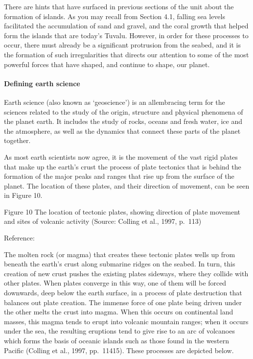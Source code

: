 \documentclass[letterpaper,10pt,english]{sphinxmanual}
\let\sphinxpxdimen\pdfpxdimen\else\newdimen\sphinxpxdimen
\begin{document}
There are hints that have surfaced in previous sections of the unit about the formation of islands. As you may recall from Section 4.1, falling sea levels facilitated the accumulation of sand and gravel, and the coral growth that helped form the islands that are today’s Tuvalu. However, in order for these processes to occur, there must already be a significant protrusion from the seabed, and it is the formation of such irregularities that directs our attention to some of the most powerful forces
that have shaped, and continue to shape, our planet.


\paragraph{Defining earth science}
\label{\detokenize{content/session_00/Part_00_04:Defining-earth-science}}
Earth science (also known as ‘geoscience’) is an all\sphinxhyphen{}embracing term for the sciences related to the study of the origin, structure and physical phenomena of the planet earth. It includes the study of rocks, oceans and fresh water, ice and the atmosphere, as well as the dynamics that connect these parts of the planet together.

As most earth scientists now agree, it is the movement of the vast rigid plates that make up the earth’s crust \textendash{} the process of plate tectonics \textendash{} that is behind the formation of the major peaks and ranges that rise up from the surface of the planet. The location of these plates, and their direction of movement, can be seen in Figure 10.

\sphinxincludegraphics[width=443\sphinxpxdimen,height=316\sphinxpxdimen]{{dd205_3_010i}.jpg}

Figure 10 The location of tectonic plates, showing direction of plate movement and sites of volcanic activity (Source: Colling et al., 1997, p. 113)

Reference:

The molten rock (or magma) that creates these tectonic plates wells up from beneath the earth’s crust along submarine ridges on the seabed. In turn, this creation of new crust pushes the existing plates sideways, where they collide with other plates. When plates converge in this way, one of them will be forced downwards, deep below the earth surface, in a process of plate destruction that balances out plate creation. The immense force of one plate being driven under the other melts the crust
into magma. When this occurs on continental land masses, this magma tends to erupt into volcanic mountain ranges; when it occurs under the sea, the resulting eruptions tend to give rise to an arc of volcanoes which forms the basis of oceanic islands such as those found in the western Pacific (Colling et al., 1997, pp. 114\textendash{}15). These processes are depicted below.
\end{document}
